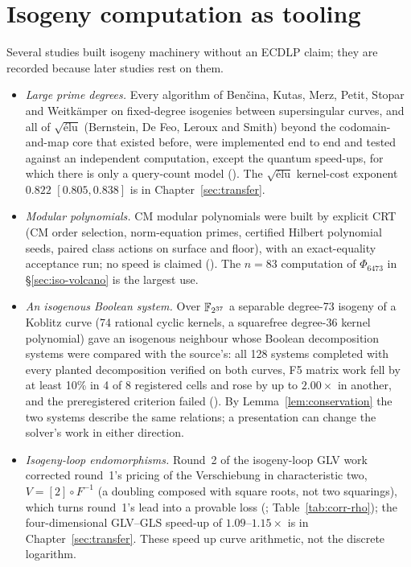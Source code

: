 \section{Isogeny computation as tooling}\label{sec:iso-tooling}

Several studies built isogeny machinery without an ECDLP claim; they are
recorded because later studies rest on them.
\begin{itemize}
\item \emph{Large prime degrees.} Every algorithm of Ben\v{c}ina, Kutas,
  Merz, Petit, Stopar and Weitk\"amper on fixed-degree isogenies between
  supersingular curves, and all of $\sqrt{\text{\'elu}}$ (Bernstein, De Feo,
  Leroux and Smith) beyond the codomain-and-map core that existed before,
  were implemented end to end and tested against an independent
  computation, except the quantum speed-ups, for which there is only a
  query-count model ().
  The $\sqrt{\text{\'elu}}$ kernel-cost exponent $0.822$ $[0.805,0.838]$ is in
  Chapter~\ref{sec:transfer}.
\item \emph{Modular polynomials.} CM modular polynomials were built by
  explicit CRT (CM order selection, norm-equation primes, certified Hilbert
  polynomial seeds, paired class actions on surface and floor), with an
  exact-equality acceptance run; no speed is claimed
  (). The $n=83$ computation of
  $\Phi_{6473}$ in \S\ref{sec:iso-volcano} is the largest use.
\item \emph{An isogenous Boolean system.} Over $\mathbb{F}_{2^{37}}$ a separable
  degree-73 isogeny of a Koblitz curve (74 rational cyclic kernels, a
  squarefree degree-36 kernel polynomial) gave an isogenous neighbour whose
  Boolean decomposition systems were compared with the source's: all 128
  systems completed with every planted decomposition verified on both
  curves, F5 matrix work fell by at least 10\% in 4 of 8 registered cells and
  rose by up to $2.00\times$ in another, and the preregistered criterion failed
  (). By
  Lemma~\ref{lem:conservation} the two systems describe the same relations;
  a presentation can change the solver's work in either direction.
\item \emph{Isogeny-loop endomorphisms.} Round~2 of the isogeny-loop GLV
  work corrected round~1's pricing of the Verschiebung in characteristic
  two, $V=[2]\circ F^{-1}$ (a doubling composed with square roots, not two
  squarings), which turns round~1's lead into a provable loss
  (;
  Table~\ref{tab:corr-rho}); the four-dimensional GLV--GLS speed-up of
  $1.09$--$1.15\times$ is in Chapter~\ref{sec:transfer}. These speed up curve
  arithmetic, not the discrete logarithm.
\end{itemize}

